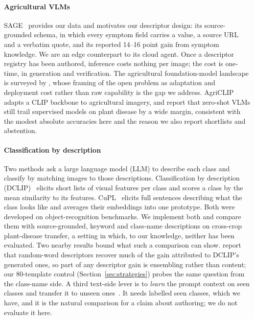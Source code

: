 \documentclass[a4paper,fleqn]{cas-dc}
\begin{document}
\paragraph{Agricultural VLMs} SAGE~\citep{arshad2026sage} provides our data and motivates our
descriptor design: its source-grounded schema, in which every symptom field carries a value, a source
URL and a verbatim quote, and its reported 14--16 point gain from symptom knowledge. We are an edge
counterpart to its cloud agent. Once a descriptor registry has been authored, inference costs
nothing per image; the cost is one-time, in generation and verification. The agricultural
foundation-model landscape is surveyed by \citet{chen2024foundation}, whose framing of the open
problem as adaptation and deployment cost rather than raw capability is the gap we address.
AgriCLIP~\citep{nawaz2024agriclip} adapts a CLIP backbone to agricultural imagery, and
\citet{lu2025vlmready} report that zero-shot VLMs still trail supervised models on plant disease by a
wide margin, consistent with the modest absolute accuracies here and the reason we also report
shortlists and abstention.

\paragraph{Classification by description} Two methods ask a large language model (LLM) to describe
each class and classify by matching images to those descriptions. Classification by description
(DCLIP)~\citep{menon2023} elicits short lists of visual features per class and scores a class by the
mean similarity to its features. CuPL~\citep{pratt2023} elicits full sentences describing what the
class looks like and averages their embeddings into one prototype. Both were developed on
object-recognition benchmarks. We implement both and compare them with source-grounded, keyword and
class-name descriptions on cross-crop plant-disease transfer, a setting in which, to our knowledge,
neither has been evaluated. Two nearby results bound what such a comparison can show.
\citet{roth2023waffle} report that random-word descriptors recover much of the gain attributed to
DCLIP's generated ones, so part of any descriptor gain is ensembling rather than content; our
80-template control (Section~\ref{sec:strategies}) probes the same question from the class-name
side. A third text-side lever is to \emph{learn} the prompt context on seen classes and transfer it
to unseen ones~\citep{zhou2022coop,zhou2022cocoop}. It needs labelled seen classes, which we have,
and it is the natural comparison for a claim about authoring; we do not evaluate it here.
\end{document}

